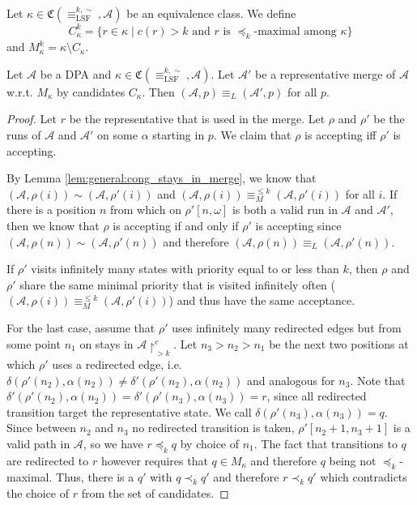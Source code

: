 \begin{defn}
	Let $\kappa \in \mathfrak{C}(\equiv_\text{LSF}^{k,\sim}, \mathcal{A})$ be an equivalence class. We define $$C_\kappa^k = \{ r \in \kappa \mid c(r) > k \text{ and } r \text{ is } \preceq_k \text{-maximal among } \kappa \}$$ and $M^k_\kappa = \kappa \setminus C_\kappa$.
\end{defn}


\vspace{5pt}

\begin{lem}
	Let $\mathcal{A}$ be a DPA and $\kappa \in \mathfrak{C}(\equiv_\text{LSF}^{k,\sim}, \mathcal{A})$. Let $\mathcal{A}'$ be a representative merge of $\mathcal{A}$ w.r.t. $M_\kappa$ by candidates $C_\kappa$. Then $(\mathcal{A}, p) \equiv_L (\mathcal{A}', p)$ for all $p$.
	\label{lem:lsf:preserve_language}
\end{lem}

\begin{proof}
	Let $r$ be the representative that is used in the merge. Let $\rho$ and $\rho'$ be the runs of $\mathcal{A}$ and $\mathcal{A}'$ on some $\alpha$ starting in $p$. We claim that $\rho$ is accepting iff $\rho'$ is accepting.
	
	By Lemma \ref{lem:general:cong_stays_in_merge}, we know that $(\mathcal{A}, \rho(i)) \sim (\mathcal{A}, \rho'(i))$ and $(\mathcal{A}, \rho(i)) \equiv_M^{\leq k} (\mathcal{A}, \rho'(i))$ for all $i$. If there is a position $n$ from which on $\rho'[n,\omega]$ is both a valid run in $\mathcal{A}$ and $\mathcal{A}'$, then we know that $\rho$ is accepting if and only if $\rho'$ is accepting since $(\mathcal{A}, \rho(n)) \sim (\mathcal{A}, \rho'(n))$ and therefore $(\mathcal{A}, \rho(n)) \equiv_L (\mathcal{A}, \rho'(n))$.
	
	If $\rho'$ visits infinitely many states with priority equal to or less than $k$, then $\rho$ and $\rho'$ share the same minimal priority that is visited infinitely often ($(\mathcal{A}, \rho(i)) \equiv_M^{\leq k} (\mathcal{A}, \rho'(i))$) and thus have the same acceptance.
	
	For the last case, assume that $\rho'$ uses infinitely many redirected edges but from some point $n_1$ on stays in $\mathcal{A}\upharpoonright^c_{>k}$. Let $n_3 > n_2 > n_1$ be the next two positions at which $\rho'$ uses a redirected edge, i.e. $\delta(\rho'(n_2), \alpha(n_2)) \neq \delta'(\rho'(n_2), \alpha(n_2))$ and analogous for $n_3$. Note that $\delta'(\rho'(n_2), \alpha(n_2)) = \delta'(\rho'(n_3), \alpha(n_3)) = r$, since all redirected transition target the representative state. We call $\delta(\rho'(n_3), \alpha(n_3)) = q$. Since between $n_2$ and $n_3$ no redirected transition is taken, $\rho'[n_2 + 1, n_3 + 1]$ is a valid path in $\mathcal{A}$, so we have $r \preceq_k q$ by choice of $n_1$. The fact that transitions to $q$ are redirected to $r$ however requires that $q \in M_\kappa$ and therefore $q$ being not $\preceq_k$-maximal. Thus, there is a $q'$ with $q \prec_k q'$ and therefore $r \prec_k q'$ which contradicts the choice of $r$ from the set of candidates.
\end{proof}

